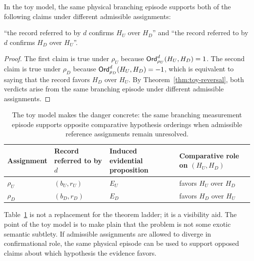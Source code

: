 \begin{corollary}
\label{cor:toy-opposed}
In the toy model, the same physical branching episode supports both of the following claims under different admissible assignments:
\begin{center}
\enquote{the record referred to by $d$ confirms $H_U$ over $H_D$}
\qquad and \qquad
\enquote{the record referred to by $d$ confirms $H_D$ over $H_U$}.
\end{center}
\end{corollary}

\begin{proof}
The first claim is true under $\rho_U$ because $\mathsf{Ord}_{\rho_U}^d(H_U,H_D)=1$. The second claim is true under $\rho_D$ because $\mathsf{Ord}_{\rho_D}^d(H_U,H_D)=-1$, which is equivalent to saying that the record favors $H_D$ over $H_U$. By Theorem~\ref{thm:toy-reversal}, both verdicts arise from the same branching episode under different admissible assignments.
\end{proof}

\begin{table}[t]
\centering
\small
\begin{tabular}{>{\raggedright\arraybackslash}p{} >{\raggedright\arraybackslash}p{} >{\raggedright\arraybackslash}p{} >{\raggedright\arraybackslash}p{}}
\toprule
Assignment & Record referred to by $d$ & Induced evidential proposition & Comparative role on $(H_U,H_D)$ \\
\midrule
$\rho_U$ & $(b_U,r_U)$ & $E_U$ & favors $H_U$ over $H_D$ \\
$\rho_D$ & $(b_D,r_D)$ & $E_D$ & favors $H_D$ over $H_U$ \\
\bottomrule
\end{tabular}
\caption{The toy model makes the danger concrete: the same branching measurement episode supports opposite comparative hypothesis orderings when admissible reference assignments remain unresolved.}
\label{tab:toy-model}
\end{table}

\begin{remark}
Table~\ref{tab:toy-model} is not a replacement for the theorem ladder; it is a visibility aid. The point of the toy model is to make plain that the problem is not some exotic semantic subtlety. If admissible assignments are allowed to diverge in confirmational role, the same physical episode can be used to support opposed claims about which hypothesis the evidence favors.
\end{remark}

